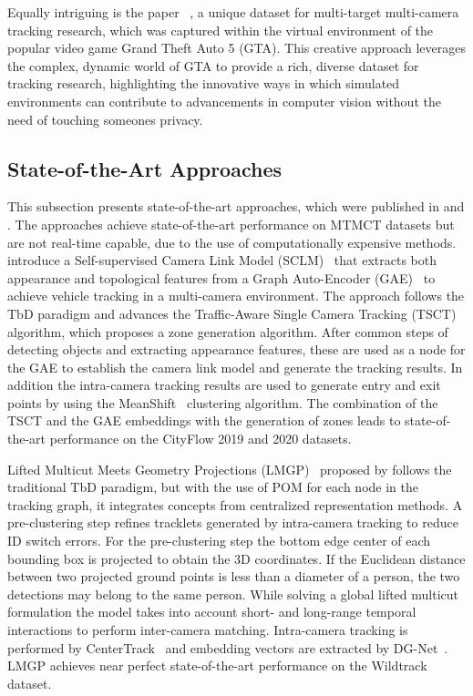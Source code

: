 Equally intriguing is the paper ~\cite{Koehl20}, a unique dataset for multi-target multi-camera tracking research, which was captured within the virtual environment of the popular video game Grand Theft Auto 5 (GTA). This creative approach leverages the complex, dynamic world of GTA to provide a rich, diverse dataset for tracking research, highlighting the innovative ways in which simulated environments can contribute to advancements in computer vision without the need of touching someones privacy.

\subsection{State-of-the-Art Approaches}\label{subsec:state-of-the-art_approaches}
This subsection presents state-of-the-art approaches, which were published in \citeyear{Hsu22} and \citeyear{Teepe23}. The approaches achieve state-of-the-art performance on MTMCT datasets but are not real-time capable, due to the use of computationally expensive methods.
\citeauthor{Hsu22} introduce a Self-supervised Camera Link Model (SCLM)~\cite{Hsu22} that extracts both appearance and topological features from a Graph Auto-Encoder (GAE)~\cite{Kipf16} to achieve vehicle tracking in a multi-camera environment. The approach follows the TbD paradigm and advances the Traffic-Aware Single Camera Tracking (TSCT)~\cite{Hsu20} algorithm, which proposes a zone generation algorithm. After common steps of detecting objects and extracting appearance features, these are used as a node for the GAE to establish the camera link model and generate the tracking results. In addition the intra-camera tracking results are used to generate entry and exit points by using the MeanShift~\cite{Comaniciu02} clustering algorithm. The combination of the TSCT and the GAE embeddings with the generation of zones leads to state-of-the-art performance on the CityFlow 2019 and 2020 datasets.

Lifted Multicut Meets Geometry Projections (LMGP)~\cite{Nguyen22a} proposed by \citeauthor{Nguyen22a} follows the traditional TbD paradigm, but with the use of POM for each node in the tracking graph, it integrates concepts from centralized representation methods. A pre-clustering step refines tracklets generated by intra-camera tracking to reduce ID switch errors. For the pre-clustering step the bottom edge center of each bounding box is projected to obtain the 3D coordinates. If the Euclidean distance between two projected ground points is less than a diameter of a person, the two detections may belong to the same person. While solving a global lifted multicut formulation the model takes into account short- and long-range temporal interactions  to perform inter-camera matching. Intra-camera tracking is performed by CenterTrack~\cite{Zhou20} and embedding vectors are extracted by DG-Net~\cite{Zheng19}. LMGP achieves near perfect state-of-the-art performance on the Wildtrack dataset.

